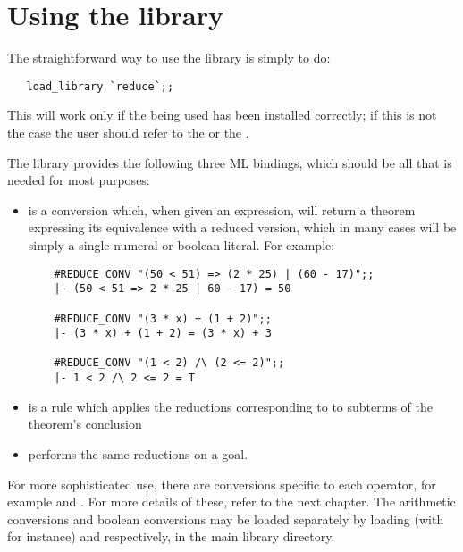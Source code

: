 \section{Using the library}

The straightforward way to use the library is simply to do:

\begin{hol}\begin{verbatim}
   load_library `reduce`;;
\end{verbatim}\end{hol}

\noindent This will work only if the \HOL\/ being used has been installed
correctly; if this is not the case the user should refer to the \TUTORIAL\/ or
the \DESCRIPTION.

The library provides the following three ML bindings, which should be all that
is needed for most purposes:

\begin{itemize}

  \item {} is a conversion which, when given an expression, will
  return a theorem expressing its equivalence with a reduced version, which in
  many cases will be simply a single numeral or boolean literal. For example:

  {\small\begin{verbatim}
    #REDUCE_CONV "(50 < 51) => (2 * 25) | (60 - 17)";;
    |- (50 < 51 => 2 * 25 | 60 - 17) = 50

    #REDUCE_CONV "(3 * x) + (1 + 2)";;
    |- (3 * x) + (1 + 2) = (3 * x) + 3

    #REDUCE_CONV "(1 < 2) /\ (2 <= 2)";;
    |- 1 < 2 /\ 2 <= 2 = T
  \end{verbatim}}

  \item {} is a rule which applies the reductions corresponding
  to  to subterms of the theorem's conclusion

  \item {} performs the same reductions on a goal.

\end{itemize}

\noindent For more sophisticated use, there are conversions specific to each
operator, for example  and . For more details of
these, refer to the next chapter. The arithmetic conversions and boolean
conversions may be loaded separately by loading (with  for instance)
 and  respectively, in the main library
directory.
